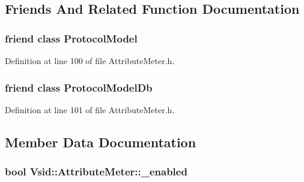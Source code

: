 \subsection{Friends And Related Function Documentation}
\hypertarget{class_vsid_1_1_attribute_meter_a80219b863d4ff3456933d16bc5f73f45}{
\subsubsection[{Protocol\-Model}]{\setlength{\rightskip}{0pt plus 5cm}friend class {\bf Protocol\-Model}\hspace{0.3cm}{\ttfamily [friend]}}}\label{class_vsid_1_1_attribute_meter_a80219b863d4ff3456933d16bc5f73f45}


Definition at line 100 of file Attribute\-Meter.\-h.

\hypertarget{class_vsid_1_1_attribute_meter_a3c0d389e7a9476b06313d8fb9ca9fe68}{
\subsubsection[{Protocol\-Model\-Db}]{\setlength{\rightskip}{0pt plus 5cm}friend class {\bf Protocol\-Model\-Db}\hspace{0.3cm}{\ttfamily [friend]}}}\label{class_vsid_1_1_attribute_meter_a3c0d389e7a9476b06313d8fb9ca9fe68}


Definition at line 101 of file Attribute\-Meter.\-h.



\subsection{Member Data Documentation}
\hypertarget{class_vsid_1_1_attribute_meter_a3eaf1e00fcc684082adabd65e5a4745e}{
\subsubsection[{\-\_\-enabled}]{\setlength{\rightskip}{0pt plus 5cm}bool Vsid\-::\-Attribute\-Meter\-::\-\_\-enabled\hspace{0.3cm}{\ttfamily [protected]}}}\label{class_vsid_1_1_attribute_meter_a3eaf1e00fcc684082adabd65e5a4745e}


